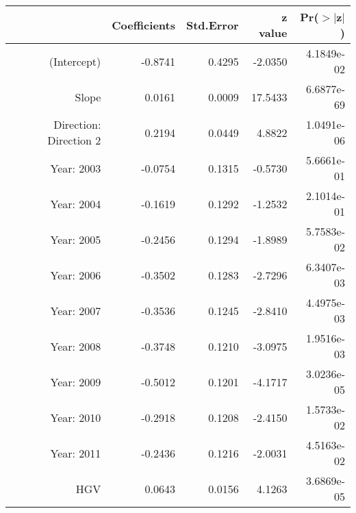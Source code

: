 \begin{table}[ht]
\centering
\begin{tabular}{rrrrr}
  \hline
 & Coefficients & Std.Error & z value & Pr($>$$|$z$|$) \\ 
  \hline
(Intercept) & -0.8741 & 0.4295 & -2.0350 & 4.1849e-02 \\ 
  Slope & 0.0161 & 0.0009 & 17.5433 & 6.6877e-69 \\ 
  Direction: Direction 2 & 0.2194 & 0.0449 & 4.8822 & 1.0491e-06 \\ 
  Year: 2003 & -0.0754 & 0.1315 & -0.5730 & 5.6661e-01 \\ 
  Year: 2004 & -0.1619 & 0.1292 & -1.2532 & 2.1014e-01 \\ 
  Year: 2005 & -0.2456 & 0.1294 & -1.8989 & 5.7583e-02 \\ 
  Year: 2006 & -0.3502 & 0.1283 & -2.7296 & 6.3407e-03 \\ 
  Year: 2007 & -0.3536 & 0.1245 & -2.8410 & 4.4975e-03 \\ 
  Year: 2008 & -0.3748 & 0.1210 & -3.0975 & 1.9516e-03 \\ 
  Year: 2009 & -0.5012 & 0.1201 & -4.1717 & 3.0236e-05 \\ 
  Year: 2010 & -0.2918 & 0.1208 & -2.4150 & 1.5733e-02 \\ 
  Year: 2011 & -0.2436 & 0.1216 & -2.0031 & 4.5163e-02 \\ 
  HGV & 0.0643 & 0.0156 & 4.1263 & 3.6869e-05 \\ 
   \hline
\end{tabular}
\end{table}
